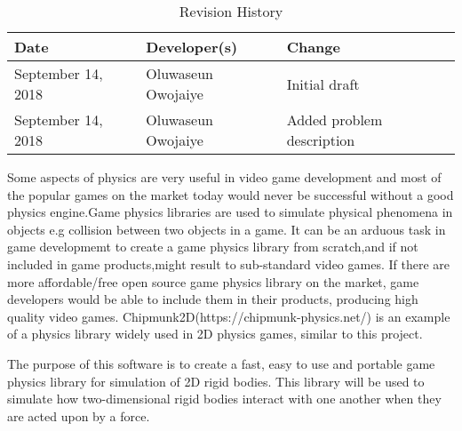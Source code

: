 \documentclass [12pt] {article}
\date{September 18, 2018}
\begin{document}
	\maketitle

\begin{table}[hp] \caption{Revision History} \label{TblRevisionHistory}
\begin{tabularx}{\textwidth}{llX} \toprule \textbf{Date} & \textbf{Developer(s)}
& \textbf{Change}\\ \midrule September 14, 2018 & Oluwaseun Owojaiye & Initial
draft\\ September 14, 2018 & Oluwaseun Owojaiye & Added problem description\\
\bottomrule \end{tabularx} \end{table}


Some aspects of physics are very useful in video game development and most of
the popular games on the market today would never be successful without a good
physics engine.Game physics libraries are used to simulate physical phenomena in
objects e.g collision between two objects in a game. It can be an arduous task
in game developmemt to create a game physics library from scratch,and if not
included in game products,might result to sub-standard video games. If there are
more affordable/free open source game physics library on the market, game
developers would be able to include them in their products, producing high
quality video games. Chipmunk2D(https://chipmunk-physics.net/) is an example of
a physics library widely used in 2D physics games, similar to this project.

The purpose of this software is to create a fast, easy to use and portable game
physics library for simulation of 2D rigid bodies. This library will be used to
simulate how two-dimensional rigid bodies interact with one another when they
are acted upon by a force.




	
\end{document}
